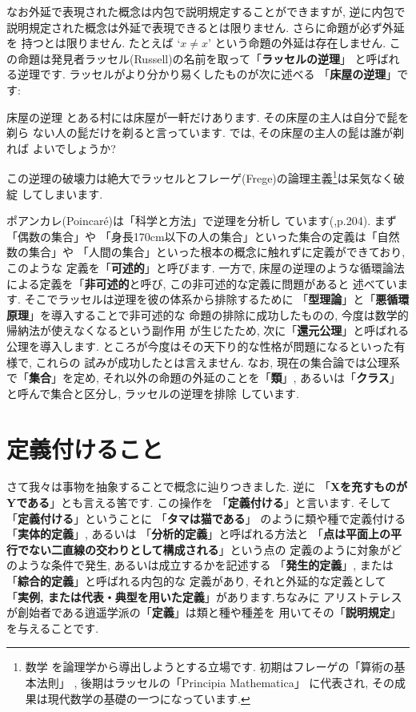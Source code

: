 なお外延で表現された概念は内包で説明規定することができますが, 逆に内包で
説明規定された概念は外延で表現できるとは限りません. さらに命題が必ず外延を
持つとは限りません. たとえば `$x \neq x$' という命題の外延は存在しません.
 この命題は発見者ラッセル(Russell)の名前を取って「\textbf{ラッセルの逆理}」
と呼ばれる逆理です. ラッセルがより分かり易くしたものが次に述べる
「\textbf{床屋の逆理}」です:

\begin{itembox}[c]{{床屋の逆理}}
\quad とある村には床屋が一軒だけあります. その床屋の主人は自分で髭を剃ら
ない人の髭だけを剃ると言っています. では, その床屋の主人の髭は誰が剃れば
よいでしょうか?
\end{itembox}


この逆理の破壊力は絶大でラッセルとフレーゲ(Frege)の論理主義\footnote{数学
を論理学から導出しようとする立場です. 初期はフレーゲの「算術の基本法則」
\cite{フレーゲ}, 後期はラッセルの「Principia Mathematica」\cite{Russell}
に代表され, その成果は現代数学の基礎の一つになっています.}は呆気なく破綻
してしまいます.
\newline


ポアンカレ(Poincar\'e)は「科学と方法」\cite{ポアンカレ}で逆理を分析し
ています(\cite{ポアンカレ},p.204). まず「偶数の集合」や
「身長170cm以下の人の集合」といった集合の定義は「自然数の集合」や
「人間の集合」といった根本の概念に触れずに定義ができており, このような
定義を「\textbf{可述的}」と呼びます. 一方で, 床屋の逆理のような循環論法
による定義を「\textbf{非可述的}と呼び, この非可述的な定義に問題があると
述べています. そこでラッセルは逆理を彼の体系から排除するために
「\textbf{型理論}」と「\textbf{悪循環原理}」を導入することで非可述的な
命題の排除に成功したものの, 今度は数学的帰納法が使えなくなるという副作用
が生じたため,  次に「\textbf{還元公理}」と呼ばれる公理を導入します. 
 ところが今度はその天下り的な性格が問題になるといった有様で, これらの
試みが成功したとは言えません\cite{Russell}. なお, 現在の集合論では公理系
で「\textbf{集合}」を定め, それ以外の命題の外延のことを「\textbf{類}」,
 あるいは「\textbf{クラス}」と呼んで集合と区分し, ラッセルの逆理を排除
しています.

\section{定義付けること}

さて我々は事物を抽象することで概念に辿りつきました. 逆に
「\textbf{Xを充すものがYである}」とも言える筈です. この操作を
「\textbf{定義付ける}」と言います. そして「\textbf{定義付ける}」ということに
「\textbf{タマは猫である}」 のように類や種で定義付ける「\textbf{実体的定義}」,
 あるいは 「\textbf{分析的定義}」と呼ばれる方法と
「\textbf{点は平面上の平行でない二直線の交わりとして構成される}」という点の
定義のように対象がどのような条件で発生, あるいは成立するかを記述する
「\textbf{発生的定義}」, または 「\textbf{綜合的定義}」と呼ばれる内包的な
定義があり, それと外延的な定義として
「\textbf{実例, または代表・典型を用いた定義}」があります.ちなみに
アリストテレスが創始者である逍遥学派の「\textbf{定義}」は類と種や種差を
用いてその「\textbf{説明規定}」を与えることです.


